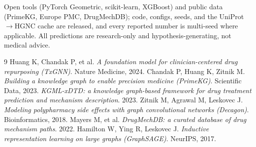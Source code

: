 \documentclass[11pt]{article}
\begin{document}
Open tools (PyTorch Geometric, scikit-learn, XGBoost) and public data (PrimeKG,
Europe PMC, DrugMechDB); code, configs, seeds, and the UniProt$\rightarrow$HGNC
cache are released, and every reported number is multi-seed where applicable. All
predictions are research-only and hypothesis-generating, not medical advice.

\begin{thebibliography}{9}
\small
{} Huang K, Chandak P, et al. \textit{A foundation model for
clinician-centered drug repurposing (TxGNN)}. Nature Medicine, 2024.
 Chandak P, Huang K, Zitnik M. \textit{Building a knowledge graph
to enable precision medicine (PrimeKG)}. Scientific Data, 2023.
 \textit{KGML-xDTD: a knowledge graph-based framework for drug
treatment prediction and mechanism description}. 2023.
 Zitnik M, Agrawal M, Leskovec J. \textit{Modeling polypharmacy
side effects with graph convolutional networks (Decagon)}. Bioinformatics, 2018.
 Mayers M, et al. \textit{DrugMechDB: a curated database of
drug mechanism paths}. 2022.
 Hamilton W, Ying R, Leskovec J. \textit{Inductive representation
learning on large graphs (GraphSAGE)}. NeurIPS, 2017.
\end{thebibliography}
\end{document}
